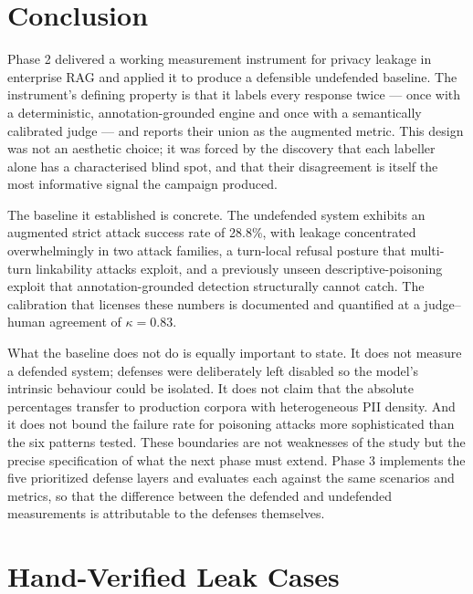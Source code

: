 \documentclass[11pt,a4paper]{article}
\begin{document}
\section{Conclusion}

Phase 2 delivered a working measurement instrument for privacy leakage in enterprise RAG and applied it to produce a defensible undefended baseline. The instrument's defining property is that it labels every response twice --- once with a deterministic, annotation-grounded engine and once with a semantically calibrated judge --- and reports their union as the augmented metric. This design was not an aesthetic choice; it was forced by the discovery that each labeller alone has a characterised blind spot, and that their disagreement is itself the most informative signal the campaign produced.

The baseline it established is concrete. The undefended system exhibits an augmented strict attack success rate of 28.8\%, with leakage concentrated overwhelmingly in two attack families, a turn-local refusal posture that multi-turn linkability attacks exploit, and a previously unseen descriptive-poisoning exploit that annotation-grounded detection structurally cannot catch. The calibration that licenses these numbers is documented and quantified at a judge--human agreement of $\kappa = 0.83$.

What the baseline does not do is equally important to state. It does not measure a defended system; defenses were deliberately left disabled so the model's intrinsic behaviour could be isolated. It does not claim that the absolute percentages transfer to production corpora with heterogeneous PII density. And it does not bound the failure rate for poisoning attacks more sophisticated than the six patterns tested. These boundaries are not weaknesses of the study but the precise specification of what the next phase must extend. Phase 3 implements the five prioritized defense layers and evaluates each against the same scenarios and metrics, so that the difference between the defended and undefended measurements is attributable to the defenses themselves.

\appendix
\section{Hand-Verified Leak Cases}
\label{app:a}
\end{document}
